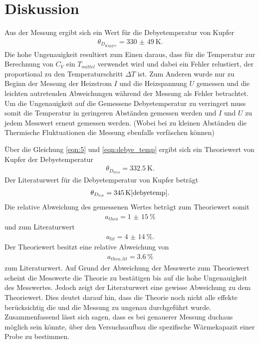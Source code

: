 \section{Diskussion}
\label{sec:Diskussion}

Aus der Messung ergibt sich ein Wert für die Debyetemperatur von Kupfer
\begin{align}
  \theta_{D_{Kupfer}} = \SI{330(49)}{\kelvin}.
\end{align}
Die hohe Ungenauigkeit resultiert zum Einen daraus, dass für die Temperatur zur Berechnung von
$C_V$ ein $T_{mittel}$ verwendet wird und dabei ein Fehler relustiert, der proportional
zu den Temperaturschritt $\Delta T$ ist. Zum Anderen wurde
nur zu  Beginn der Messung der Heizstrom $I$ und die Heizspannung $U$
gemessen und die leichten autretenden Abweichungen während der Messung als Fehler betrachtet.
Um die Ungenauigkeit auf die Gemessene Debyetemperatur zu verringert muss somit die
Temperatur in geringeren Abständen gemessen werden und $I$ und $U$ zu jedem
Messwert erneut gemessen werden. (Wobei bei zu kleinen
Abständen die Thermische Fluktuationen die Messung ebenfalls verfäschen können)

Über die Gleichung \eqref{eqn:5} und \eqref{eqn:debye_temp}
ergibt sich ein Theoriewert von Kupfer der Debyetemperatur
\begin{align}
  \theta_{D_{theo}} = \SI{332.5}{\kelvin}.
\end{align}
Der Literaturwert für die Debyetemperatur von
Kupfer beträgt
\begin{align}
  \theta_{D_{lit}} = \SI{345}{\kelvin}   \text{\cite{debyetemp}.}
\end{align}
Die relative Abweichung des gemessenen Wertes beträgt zum Theoriewert somit
\begin{align}
a_{theo} = \SI{1(15)}{\percent}
\end{align}
und zum Literaturwert
\begin{align}
  a_{lit}= \SI{4(14)}{\percent}.
\end{align}
Der Theoriewert besitzt eine relative Abweichung von
\begin{align}
  a_{theo,lit}=\SI{3.6}{\percent}
\end{align}
zum Literaturwert.
Auf Grund der Abweichung der Messwerte zum Theoriewert
scheint die Messwerte die Theorie zu bestätigen bis auf die
hohe Ungenauigkeit des Messwertes. Jedoch zeigt
der Literaturwert eine gewisse Abweichung zu dem Theoriewert.
Dies deutet darauf hin, dass die Theorie noch nicht alle
effekte berücksichtig die und die Messung zu ungenau durchgeführt wurde.
Zusammenfassend lässt sich sagen, dass es bei genauerer Messung
duchaus möglich sein könnte, über den Versuchsaufbau die spezifische
Wärmekapazit einer Probe zu bestimmen.
